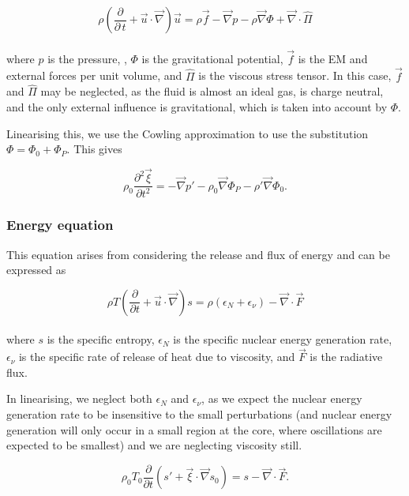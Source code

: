 \documentclass[11pt]{amsart}
\begin{document}
\begin{equation} \rho \left( \frac{\partial}{\partial \, t} +  \vec{u} \cdot \vec{\nabla} \right)
\vec{u} = \rho \vec{f} - \vec{\nabla} p - \rho \vec{\nabla} \Phi + \vec{\nabla} \cdot \hat{\Pi}
\end{equation}
\\
where $p$ is the pressure, , $\Phi$ is the gravitational potential, $\vec{f}$ is
the EM and external forces per unit volume, and $\hat{\Pi}$ is the viscous stress tensor. In this
case, $\vec{f}$ and $\hat{\Pi}$ may be neglected, as the fluid is almost an ideal gas, is charge
neutral, and the only external influence is gravitational, which is taken into account by $\Phi$.

Linearising this, we use the Cowling approximation to use the substitution $\Phi = \Phi_{0} + \Phi_{P}$.
This gives

\begin{equation}
\rho_{0} \frac{\partial^{2} \vec{\xi}}{\partial t^{2}} = - \vec{\nabla} p' - \rho_{0} \vec{\nabla} \Phi_{P}
- \rho' \vec{\nabla} \Phi_{0}.
\end{equation}



\subsubsection{Energy equation}

This equation arises from considering the release and flux of energy and can be expressed as

\begin{equation}
\rho T \left( \frac{\partial}{\partial t} + \vec{u} \cdot \vec{\nabla} \right) s =
\rho \left( \epsilon_{N} + \epsilon_{\nu} \right) - \vec{\nabla} \cdot \vec{F}
\end{equation}
\\
where $s$ is the specific entropy, $\epsilon_{N}$ is the specific nuclear energy generation rate,
$\epsilon_{\nu}$ is the specific rate of release of heat due to viscosity, and $\vec{F}$ is the radiative flux.

In linearising, we neglect both $\epsilon_{N}$ and $\epsilon_{\nu}$, as we expect the nuclear energy
generation rate to be insensitive to the small perturbations (and nuclear energy generation will only
occur in a small region at the core, where oscillations are expected to be smallest) and we are
neglecting viscosity still.

\begin{equation}
\rho_{0} T_{0} \frac{\partial}{\partial t} \left( s' + \vec{\xi} \cdot \vec{\nabla} s_{0} \right)
= s - \vec{\nabla} \cdot \vec{F}.
\end{equation}
\\
\end{document}
